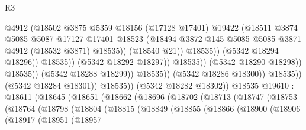 \begin{lexlean}{R3}
\begin{coremodule}
                                              @4912
                                              (@18502
                                                @3875
                                                @5359
                                                @18156
                                                (@17128 @17401)
                                                @19422
                                                (@18511
                                                  @3874
                                                  @5085
                                                  @5087
                                                  @17127
                                                  @17401
                                                  @18523
                                                  (@18494
                                                    @3872
                                                    @145
                                                    @5085
                                                    @5085
                                                    @3871
                                                    @4912
                                                    (@18532 @3871)
                                                    @18535))
                                                (@18540 @21))
                                              @18535))
                                          (@5342 @18294 @18296))
                                        @18535))
                                    (@5342 @18292 @18297))
                                  @18535))
                              (@5342 @18290 @18298))
                            @18535))
                        (@5342 @18288 @18299))
                      @18535))
                  (@5342 @18286 @18300))
                @18535))
            (@5342 @18284 @18301))
          @18535))
      (@5342 @18282 @18302))
    @18535
@19610 := @18611
    (@18645
      (@18651
        (@18662
          (@18696
            (@18702
              (@18713
                (@18747
                  (@18753
                    (@18764
                      (@18798
                        (@18804
                          (@18815
                            (@18849
                              (@18855
                                (@18866
                                  (@18900
                                    (@18906
                                      (@18917
                                        (@18951
                                          (@18957

\end{coremodule}
\end{lexlean}
